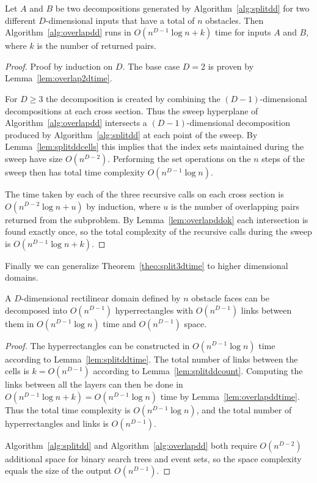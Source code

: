 \documentclass[english,gradu]{tktltiki2018}
\begin{document}
\begin{lem}\label{lem:overlapddtime}
Let $A$ and $B$ be two decompositions generated by Algorithm~\ref{alg:splitdd} for two different $D$-dimensional inputs that have a total of $n$ obstacles.
Then Algorithm~\ref{alg:overlapdd} runs in $O(n^{D-1}\log n + k)$ time for inputs $A$ and $B$, where $k$ is the number of returned pairs.
\end{lem}
\begin{proof}
Proof by induction on $D$.
The base case $D=2$ is proven by Lemma~\ref{lem:overlap2dtime}.

For $D\ge 3$ the decomposition is created by combining the $(D-1)$-dimensional decompositions at each cross section.
Thus the sweep hyperplane of Algorithm~\ref{alg:overlapdd} intersects a $(D-1)$-dimensional decomposition produced by Algorithm~\ref{alg:splitdd} at each point of the sweep.
By Lemma~\ref{lem:splitddcells} this implies that the index sets maintained during the sweep have size $O(n^{D-2})$.
Performing the set operations on the $n$ steps of the sweep then has total time complexity $O(n^{D-1}\log n)$.

The time taken by each of the three recursive calls on each cross section is $O(n^{D-2}\log n + u)$ by induction, where $u$ is the number of overlapping pairs returned from the subproblem.
By Lemma~\ref{lem:overlapddok} each intersection is found exactly once, so the total complexity of the recursive calls during the sweep is $O(n^{D-1}\log n + k)$.
\end{proof}

Finally we can generalize Theorem~\ref{theo:split3dtime} to higher dimensional domains.

\begin{theo}\label{theo:splitddtime}A $D$-dimensional rectilinear domain defined by $n$ obstacle faces can be decomposed into $O(n^{D-1})$ hyperrectangles with $O(n^{D-1})$ links between them in $O(n^{D-1}\log n)$ time and $O(n^{D-1})$ space.\end{theo}
\begin{proof}
The hyperrectangles can be constructed in $O(n^{D-1}\log n)$ time according to Lemma~\ref{lem:splitddtime}.
The total number of links between the cells is $k=O(n^{D-1})$ according to Lemma~\ref{lem:splitddcount}.
Computing the links between all the layers can then be done in $O(n^{D-1}\log n+k)=O(n^{D-1}\log n)$ time by Lemma~\ref{lem:overlapddtime}.
Thus the total time complexity is $O(n^{D-1}\log n)$, and the total number of hyperrectangles and links is $O(n^{D-1})$.

Algorithm~\ref{alg:splitdd} and Algorithm~\ref{alg:overlapdd} both require $O(n^{D-2})$ additional space for binary search trees and event sets, so the space complexity equals the size of the output $O(n^{D-1})$.
\end{proof}
\end{document}
